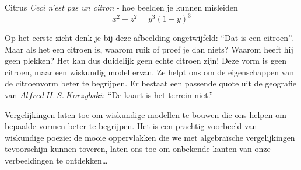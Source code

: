 \begin{surferPage}{Citrus}
{\it Ceci n'est pas un citron} - hoe beelden je kunnen misleiden\\
\smallskip
\[x^2 + z^2 = y^3 (1 - y)^3\] 


\singlespacing
Op het eerste zicht denk je bij deze afbeelding ongetwijfeld: ``Dat is een citroen''. Maar als het een citroen is, waarom ruik of proef je dan niets? Waarom heeft hij geen plekken? Het kan dus duidelijk geen echte citroen zijn! 
\singlespacing
Deze vorm is geen citroen, maar een wiskundig model ervan. Ze helpt ons om de eigenschappen van de citroenvorm beter te begrijpen. Er bestaat een passende quote uit de geografie van $Alfred\ H.\ S.\ Korzybski$: ``De kaart is het terrein niet.'' \\
\singlespacing

Vergelijkingen laten toe om wiskundige modellen te bouwen die ons helpen om bepaalde vormen beter te begrijpen. 
\singlespacing
Het is een prachtig voorbeeld van wiskundige po\"ezie: de mooie oppervlakken die we met algebra\"ische vergelijkingen tevoorschijn kunnen toveren, laten ons toe om onbekende kanten van onze verbeeldingen te ontdekken\dots
\end{surferPage}
